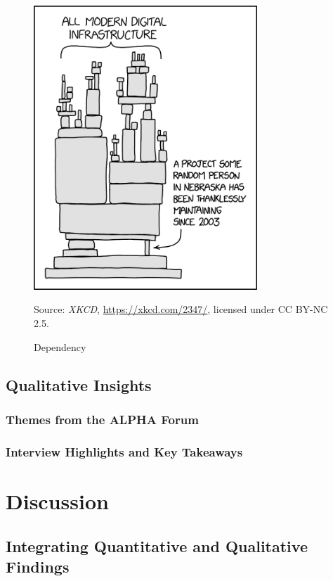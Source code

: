 \documentclass{article}
\begin{document}
\begin{figure}[h!] 
    \centering
    \includegraphics[width=0.75\textwidth]{dependency.png} 
    \caption{Dependency}
    \label{fig:dependency_comic}
    \small Source: \textit{XKCD}, \url{https://xkcd.com/2347/}, licensed under CC BY-NC 2.5.
\end{figure}


\subsection{Qualitative Insights}
\subsubsection{Themes from the ALPHA Forum}
\subsubsection{Interview Highlights and Key Takeaways}

\section{Discussion}

\subsection{Integrating Quantitative and Qualitative Findings}
\end{document}
